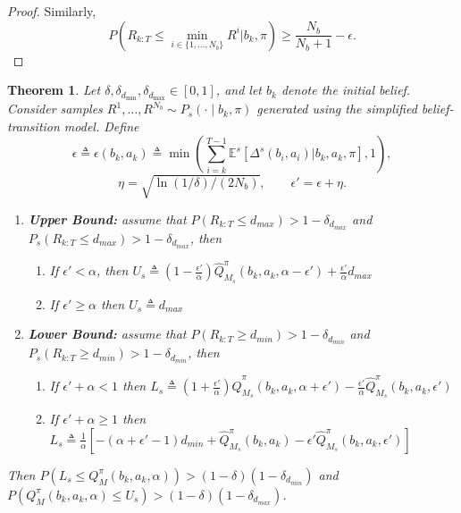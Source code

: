 \documentclass[acmlarge, manuscript, screen, review, natbib=false, oneside]{acmart}
\newtheorem{theorem}{Theorem}[section]
\begin{document}
\begin{proof}
	Similarly, 
	\begin{equation}
		P\!\left(R_{k:T} \leq \min_{i \in \{1,\dots, N_b\}} R^i \Big| b_k ,\pi \right)
		\geq \frac{N_b}{N_b+1} - \epsilon.
	\end{equation}	
\end{proof}

\begin{theorem}\label{prf:trivial_d_guarantees}
	Let $\delta,\delta_{d_{\min}}, \delta_{d_{\max}} \in [0,1]$, and let $b_k$ denote the initial belief. Consider samples $R^1,\dots,R^{N_b} \sim P_s(\cdot \mid b_k,\pi)$ generated using the simplified belief-transition model. Define
	\begin{equation}
		\epsilon \triangleq \epsilon(b_k, a_k) \triangleq \min(\sum_{i=k}^{T-1} \mathbb{E}^s[\Delta^s(b_i, a_i)|b_k, a_k,\pi], 1),
	\end{equation}
	\begin{equation}
		\eta = \sqrt{\ln(1/\delta)/(2N_b)}, \qquad \epsilon' = \epsilon + \eta.
	\end{equation}
	\begin{enumerate}
		\item \textbf{Upper Bound:} assume that $P(R_{k:T}\leq d_{max})>1-\delta_{d_{max}}$ and $P_s(R_{k:T}\leq d_{max})>1-\delta_{d_{max}}$, then \begin{enumerate}
			\item If $\epsilon'<\alpha$, then
			$U_s\triangleq (1-\frac{\epsilon'}{\alpha}) \hat{Q}^\pi_{M_s}(b_k,a_k,\alpha-\epsilon') + \frac{\epsilon'}{\alpha}d_{max}$
			\item If $\epsilon' \geq \alpha$ then $U_s\triangleq d_{max}$
		\end{enumerate}
		\item \textbf{Lower Bound:} assume that $P(R_{k:T}\geq d_{min})>1-\delta_{d_{min}}$ and $P_s(R_{k:T}\geq d_{min})>1-\delta_{d_{min}}$, then \begin{enumerate}
			\item If $\epsilon' + \alpha < 1$ then
			$
			L_s\triangleq (1+\frac{\epsilon'}{\alpha}) \hat{Q}^\pi_{M_s}(b_k,a_k,\alpha+\epsilon') - \frac{\epsilon'}{\alpha} \hat{Q}^\pi_{M_s}(b_k,a_k, \epsilon')
			$
			\item If $\epsilon' + \alpha \geq 1$ then 
			$
			L_s\triangleq\frac{1}{\alpha}[-(\alpha + \epsilon' - 1)
			d_{min}+\hat{Q}^\pi_{M_s}(b_k,a_k)-\epsilon' \hat{Q}^\pi_{M_s}(b_k,a_k,\epsilon')]
			$
		\end{enumerate}
	\end{enumerate}
	Then $P(L_s \leq Q_M^\pi(b_k, a_k,\alpha)) > (1-\delta)(1-\delta_{d_{min}})$ and $P(Q_M^\pi(b_k, a_k,\alpha)\leq U_s)> (1-\delta)(1-\delta_{d_{max}})$.
\end{theorem}
\end{document}
